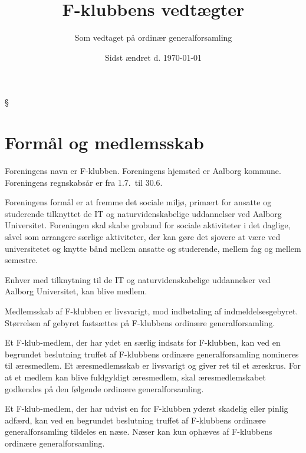 \documentclass[a4paper,12pt,danish]{article}
\title{\bf F-klubbens vedtægter}
\author{Som vedtaget på ordinær generalforsamling}
\date{Sidst ændret d. \today}
\begin{document}
\maketitle





\begin{list}
{\S {}}{}
\section{Formål og medlemsskab}
\item Foreningens navn er F-klubben. Foreningens hjemsted er Aalborg
  kommune. Foreningens regnskabsår er fra 1.7.\ til 30.6.
  
\item Foreningens formål er at fremme det sociale miljø,
  primært for ansatte og studerende tilknyttet de IT og
  naturvidenskabelige uddannelser ved Aalborg Universitet. Foreningen
  skal skabe grobund for sociale aktiviteter i det daglige, såvel
  som arrangere særlige aktiviteter, der kan gøre det sjovere at
  være ved universitetet og knytte bånd mellem ansatte og
  studerende, mellem fag og mellem semestre.

\item Enhver med tilknytning til de IT og naturvidenskabelige uddannelser ved Aalborg Universitet, kan blive medlem.

\item Medlemsskab af F-klubben er livsvarigt, mod indbetaling af indmeldelsesgebyret.
  Størrelsen af gebyret fastsættes på F-klubbens ordinære generalforsamling.
  
\item Et F-klub-medlem, der har ydet en særlig indsats for
  F-klubben, kan ved en begrundet beslutning truffet af F-klubbens
  ordinære generalforsamling nomineres til æresmedlem. Et
  æresmedlemsskab er livsvarigt og giver ret til et æreskrus. For
  at et medlem kan blive fuldgyldigt æresmedlem, skal æresmedlemskabet
	godkendes på den følgende ordinære
  generalforsamling.
  
\item Et F-klub-medlem, der har udvist en for F-klubben yderst
  skadelig eller pinlig adfærd, kan ved en begrundet beslutning
  truffet af F-klubbens ordinære generalforsamling tildeles en
  næse.  Næser kan kun ophæves af F-klubbens ordinære
  generalforsamling.


\end{list}
\end{document}
